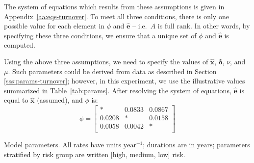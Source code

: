 The system of equations which results from these assumptions
is given in Appendix~\ref{aa:eqs-turnover}.
To meet all three conditions, there is only one possible value
for each element in $\phi$ and $\bm{\hat{e}}$
-- i.e.\ $A$ is full rank.
In other words, by specifying these three conditions,
we ensure that a unique set of $\phi$ and $\bm{\hat{e}}$ is computed.
\par
Using the above three assumptions,
we need to specify the values of $\bm{\hat{x}}$, $\bm{\delta}$, $\nu$, and $\mu$.
Such parameters could be derived from data as described in Section \ref{sss:params-turnover};
however, in this experiment, we use the illustrative values summarized in
Table~\ref{tab:params}.
After resolving the system of equations,
$\bm{\hat{e}}$ is equal to $\bm{\hat{x}}$ (assumed), and $\phi$ is:
\begin{equation} %
\label{eq:phi-values}
\phi = \left[\begin{array}{ccc}
*      & 0.0833 & 0.0867 \\
0.0208 & *      & 0.0158 \\
0.0058 & 0.0042 & *      \\
\end{array}\right]
\end{equation}
\begin{table}
  \centering
  \caption{Model parameters.
    All rates have units $\mathrm{year}^{-1}$; durations are in $\mathrm{years}$;
    parameters stratified by risk group are written [high, medium, low] risk.}
  \label{tab:params}
  
\end{table}
